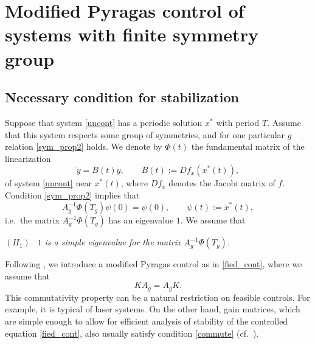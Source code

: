 \documentclass{article}
\begin{document}


\section{Modified Pyragas control of systems with finite symmetry group}
\subsection{Necessary condition for stabilization}
Suppose that system \eqref{uncont} has a periodic solution $x^*$ with period $T$. Assume that this system respects some group of symmetries, and for one particular $g$
relation \eqref{sym_prop2} holds.
We denote by $\Phi(t)$ the fundamental matrix of the linearization
\begin{equation}\label{lin}
\dot{y}=B(t)y,\qquad B(t):= D f_x(x^*(t)),
\end{equation}
of system \eqref{uncont} near $x^*(t)$, where $D f_x$ denotes the Jacobi matrix of $f$.
Condition \eqref{sym_prop2} implies that
\begin{equation}\label{cor}
A_g^{-1}\Phi(T_g) \psi(0)=\psi(0),\qquad \psi(t):=\dot x^*(t),
\end{equation}
i.e.~the matrix $A_g^{-1}\Phi(T_g)$ has an eigenvalue $1$. We assume that

\bigskip
$(H_1)$ \ {\em $1$ is a simple eigenvalue for the matrix $A_g^{-1}\Phi(T_g)$.}

\bigskip
Following \cite{schneider_Z_3}, we introduce a modified Pyragas control as in \eqref{fied_cont},
where we assume that
\begin{equation}\label{commute}
KA_g=A_gK.
\end{equation}
This commutativity property can be a natural restriction on feasible controls.
For example, it is typical of laser systems.
On the other hand, gain matrices, which are simple enough to allow for efficient analysis of stability
of the controlled equation \eqref{fied_cont}, also usually satisfy condition \eqref{commute} (cf.~\cite{mamanya1, schneider_elim}).
\end{document}
